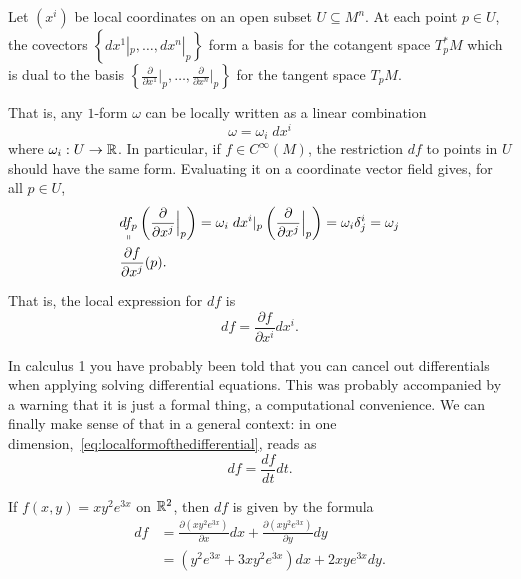 \begin{proposition}
	Let $(x^i)$ be local coordinates on an open subset $U\subseteq M^n$.
	At each point $p\in U$, the covectors $\left\{dx^1|_p, \ldots, dx^n|_p\right\}$ form a basis for the cotangent space $T_p^* M$ which is dual to the basis $\left\{\frac{\partial}{\partial x^1}\Big|_p, \ldots, \frac{\partial}{\partial x^n}\Big|_p\right\}$ for the tangent space $T_p M$.
\end{proposition}

That is, any $1$-form $\omega$ can be locally written as a linear combination
\begin{equation}
	\omega = \omega_i\; dx^i
\end{equation}
where $\omega_i:U\to\mathbb{R}$.
In particular, if $f\in C^\infty(M)$, the restriction $df$ to points in $U$ should have the same form.
Evaluating it on a coordinate vector field gives, for all $p\in U$,
\begin{align}
	 & \underset{\shortparallel}{df_p} \left(\frac{\partial}{\partial x^j}\Big|_p\right)
	= \omega_i\; dx^i|_p \left(\frac{\partial}{\partial x^j}\Big|_p\right) =
	\omega_i \delta^i_j = \omega_j                                                       \\
	 & \frac{\partial f}{\partial x^j}(p).
\end{align}

That is, the local expression for $df$ is
\begin{equation}\label{eq:localformofthedifferential}
	df =  \frac{\partial f}{\partial x^i} dx^i.
\end{equation}

\begin{remark}
	In calculus 1 you have probably been told that you can cancel out differentials when applying solving differential equations.
	This was probably accompanied by a warning that it is just a formal thing, a computational convenience.
	We can finally make sense of that in a general context: in one dimension,~\eqref{eq:localformofthedifferential}, reads as
	\begin{equation}
		d f = \frac{df}{dt}dt.
	\end{equation}
\end{remark}

\begin{example}\label{ex:diff1}
	If $f(x,y) = x y^2 e^{3x}$ on $\mathbb{R}^2$, then $df$ is given by the formula
	\begin{align}
		df
		 & = \frac{\partial (x y^2 e^{3x})}{\partial x} dx + \frac{\partial (x y^2 e^{3x})}{\partial y} dy \\
		 & = (y^2 e^{3x} +3xy^2 e^{3x}) dx + 2xy e^{3x} dy.
	\end{align}
\end{example}

